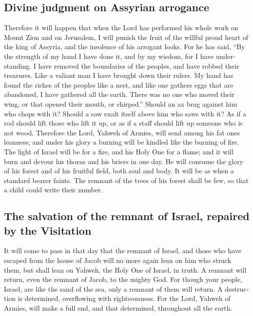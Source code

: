 \begin{paracol}{2}
\begin{otherlanguage}{english}
\hypertarget{divine-judgment-on-assyrian-arrogance}{%
\subsection{Divine judgment on Assyrian
arrogance}\label{divine-judgment-on-assyrian-arrogance}}

 Therefore it will happen that when the Lord has
performed his whole work on Mount Zion and on Jerusalem, I will punish
the fruit of the willful proud heart of the king of Assyria, and the
insolence of his arrogant looks.  For he has said, ``By
the strength of my hand I have done it, and by my wisdom, for I have
understanding. I have removed the boundaries of the peoples, and have
robbed their treasures. Like a valiant man I have brought down their
rulers.  My hand has found the riches of the peoples like
a nest, and like one gathers eggs that are abandoned, I have gathered
all the earth. There was no one who moved their wing, or that opened
their mouth, or chirped.''  Should an ax brag against him
who chops with it? Should a saw exalt itself above him who saws with it?
As if a rod should lift those who lift it up, or as if a staff should
lift up someone who is not wood.  Therefore the Lord,
Yahweh of Armies, will send among his fat ones leanness; and under his
glory a burning will be kindled like the burning of fire.
 The light of Israel will be for a fire, and his Holy One
for a flame; and it will burn and devour his thorns and his briers in
one day.  He will consume the glory of his forest and of
his fruitful field, both soul and body. It will be as when a standard
bearer faints.  The remnant of the trees of his forest
shall be few, so that a child could write their number.

\hypertarget{the-salvation-of-the-remnant-of-israel-repaired-by-the-visitation}{%
\subsection{The salvation of the remnant of Israel, repaired by the
Visitation}\label{the-salvation-of-the-remnant-of-israel-repaired-by-the-visitation}}

 It will come to pass in that day that the remnant of
Israel, and those who have escaped from the house of Jacob will no more
again lean on him who struck them, but shall lean on Yahweh, the Holy
One of Israel, in truth.  A remnant will return, even the
remnant of Jacob, to the mighty God.  For though your
people, Israel, are like the sand of the sea, only a remnant of them
will return. A destruction is determined, overflowing with
righteousness.  For the Lord, Yahweh of Armies, will make
a full end, and that determined, throughout all the earth.


\end{otherlanguage}
\end{paracol}

